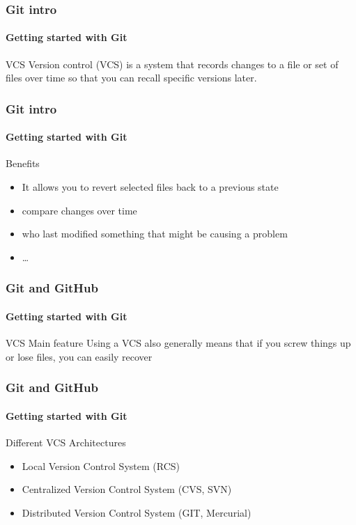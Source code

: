 \begin{frame}
    \frametitle{Git intro}
    \framesubtitle{Getting started with Git}
    \addtocounter{nframe}{1}
    
    \begin{block}{VCS}
        Version control (VCS) is a system that records changes to a file or set of files over time so that you can recall specific versions later.
    \end{block}

\end{frame}

\begin{frame}
    \frametitle{Git intro}
    \framesubtitle{Getting started with Git}
    \addtocounter{nframe}{1}

    \begin{block}{Benefits}
        \begin{itemize}
            \item It allows you to revert selected files back to a previous state
            \item compare changes over time
            \item who last modified something that might be causing a problem
            \item \dots
        \end{itemize}
    \end{block}

\end{frame}


\begin{frame}
    \frametitle{Git and GitHub}
    \framesubtitle{Getting started with Git}
    \addtocounter{nframe}{1}
    
    \begin{block}{VCS Main feature}
        Using a VCS also generally means that if you screw things up or lose files, you can easily recover
    \end{block}

\end{frame}

\begin{frame}
    \frametitle{Git and GitHub}
    \framesubtitle{Getting started with Git}
    \addtocounter{nframe}{1}
    
    \begin{block}{Different VCS Architectures}
        \begin{itemize}
            \item Local Version Control System (RCS)
            \item Centralized Version Control System (CVS, SVN)
            \item Distributed Version Control System (GIT, Mercurial)
        \end{itemize}
    \end{block}

\end{frame}

